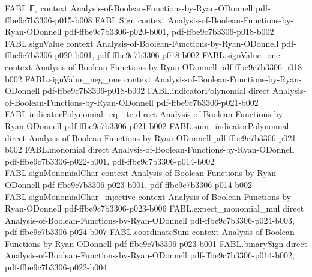 \begin{theorem}
\label{FABL.productTotalInfluence_le_four_mul_of_hasDNFWidthLE_of_monotone}
\leanok
{}
\proofstep
  {FABL.𝔽₂}
  {context}
  {Analysis-of-Boolean-Functions-by-Ryan-ODonnell}
  {pdf-ffbe9c7b3306-p015-b008}
\proofstep
  {FABL.Sign}
  {context}
  {Analysis-of-Boolean-Functions-by-Ryan-ODonnell}
  {pdf-ffbe9c7b3306-p020-b001,
    pdf-ffbe9c7b3306-p018-b002}
\proofstep
  {FABL.signValue}
  {context}
  {Analysis-of-Boolean-Functions-by-Ryan-ODonnell}
  {pdf-ffbe9c7b3306-p020-b001,
    pdf-ffbe9c7b3306-p018-b002}
\proofstep
  {FABL.signValue_one}
  {context}
  {Analysis-of-Boolean-Functions-by-Ryan-ODonnell}
  {pdf-ffbe9c7b3306-p018-b002}
\proofstep
  {FABL.signValue_neg_one}
  {context}
  {Analysis-of-Boolean-Functions-by-Ryan-ODonnell}
  {pdf-ffbe9c7b3306-p018-b002}
\proofstep
  {FABL.indicatorPolynomial}
  {direct}
  {Analysis-of-Boolean-Functions-by-Ryan-ODonnell}
  {pdf-ffbe9c7b3306-p021-b002}
\proofstep
  {FABL.indicatorPolynomial_eq_ite}
  {direct}
  {Analysis-of-Boolean-Functions-by-Ryan-ODonnell}
  {pdf-ffbe9c7b3306-p021-b002}
\proofstep
  {FABL.sum_indicatorPolynomial}
  {direct}
  {Analysis-of-Boolean-Functions-by-Ryan-ODonnell}
  {pdf-ffbe9c7b3306-p021-b002}
\proofstep
  {FABL.monomial}
  {direct}
  {Analysis-of-Boolean-Functions-by-Ryan-ODonnell}
  {pdf-ffbe9c7b3306-p022-b001,
    pdf-ffbe9c7b3306-p014-b002}
\proofstep
  {FABL.signMonomialChar}
  {context}
  {Analysis-of-Boolean-Functions-by-Ryan-ODonnell}
  {pdf-ffbe9c7b3306-p023-b001,
    pdf-ffbe9c7b3306-p014-b002}
\proofstep
  {FABL.signMonomialChar_injective}
  {context}
  {Analysis-of-Boolean-Functions-by-Ryan-ODonnell}
  {pdf-ffbe9c7b3306-p023-b006}
\proofstep
  {FABL.expect_monomial_mul}
  {direct}
  {Analysis-of-Boolean-Functions-by-Ryan-ODonnell}
  {pdf-ffbe9c7b3306-p024-b003,
    pdf-ffbe9c7b3306-p024-b007}
\proofstep
  {FABL.coordinateSum}
  {context}
  {Analysis-of-Boolean-Functions-by-Ryan-ODonnell}
  {pdf-ffbe9c7b3306-p023-b001}
\proofstep
  {FABL.binarySign}
  {direct}
  {Analysis-of-Boolean-Functions-by-Ryan-ODonnell}
  {pdf-ffbe9c7b3306-p014-b002,
    pdf-ffbe9c7b3306-p022-b004}

\end{theorem}
